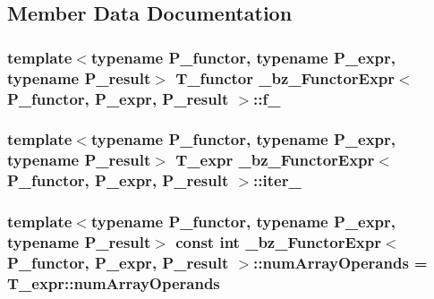 \subsection{Member Data Documentation}
\hypertarget{class__bz__FunctorExpr_acd19ef8e3e98802641e16a8a397c1d46}{}
\subsubsection[{f\+\_\+}]{\setlength{\rightskip}{0pt plus 5cm}template$<$typename P\+\_\+functor, typename P\+\_\+expr, typename P\+\_\+result$>$ {\bf T\+\_\+functor} {\bf \+\_\+bz\+\_\+\+Functor\+Expr}$<$ P\+\_\+functor, P\+\_\+expr, P\+\_\+result $>$\+::f\+\_\+\hspace{0.3cm}{\ttfamily [protected]}}\label{class__bz__FunctorExpr_acd19ef8e3e98802641e16a8a397c1d46}
\hypertarget{class__bz__FunctorExpr_a25e14fe29b6a3a91a37d9e15b448e9cb}{}
\subsubsection[{iter\+\_\+}]{\setlength{\rightskip}{0pt plus 5cm}template$<$typename P\+\_\+functor, typename P\+\_\+expr, typename P\+\_\+result$>$ {\bf T\+\_\+expr} {\bf \+\_\+bz\+\_\+\+Functor\+Expr}$<$ P\+\_\+functor, P\+\_\+expr, P\+\_\+result $>$\+::iter\+\_\+\hspace{0.3cm}{\ttfamily [protected]}}\label{class__bz__FunctorExpr_a25e14fe29b6a3a91a37d9e15b448e9cb}
\hypertarget{class__bz__FunctorExpr_a5313793b92e83ed68924f338d35aa638}{}
\subsubsection[{num\+Array\+Operands}]{\setlength{\rightskip}{0pt plus 5cm}template$<$typename P\+\_\+functor, typename P\+\_\+expr, typename P\+\_\+result$>$ const int {\bf \+\_\+bz\+\_\+\+Functor\+Expr}$<$ P\+\_\+functor, P\+\_\+expr, P\+\_\+result $>$\+::num\+Array\+Operands = T\+\_\+expr\+::num\+Array\+Operands\hspace{0.3cm}{\ttfamily [static]}}\label{class__bz__FunctorExpr_a5313793b92e83ed68924f338d35aa638}
\hypertarget{class__bz__FunctorExpr_a83a2df4fa96618cd48e31b8b7e1fd0a2}{}

